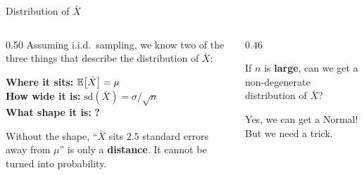\documentclass[9pt,english,aspectratio=169]{beamer}
\begin{document}
\begin{frame}{Distribution of $\bar{X}$}

  \begin{columns}[T]
    \begin{column}{0.50\textwidth}
      \vspace{0.3em}
      Assuming i.i.d.\ sampling, we know two of the three things that describe
      the distribution of $\bar{X}$:

      \vspace{0.5em}
      \begin{methodbox}
        \textbf{Where it sits:} \; $\mathbb{E}\!\left[\bar{X}\right] = \mu$
        \\[0.4em]
        \textbf{How wide it is:} \;
        $\text{sd}\!\left(\bar{X}\right) = \sigma/\sqrt{n}$ \\[0.4em]
        \textbf{What shape it is:} \;
        \textcolor{vermillion}{\textbf{?}}
      \end{methodbox}
      \pause

      \vspace{0.5em}
      Without the shape, ``$\bar{X}$ sits $2.5$ standard errors away from
      $\mu$'' is only a \textbf{distance}. It cannot be turned into probability.
    \end{column}
    \pause
    \begin{column}{0.46\textwidth}
      \vspace{0.3em}
      \begin{questionbox}
        If $n$ is \textbf{large}, can we get a non-degenerate distribution of
        $\bar{X}$?
      \end{questionbox}
      \pause

      \vspace{0.4em}
      \begin{answerbox}
        Yes, we can get a Normal! But we need a trick.
      \end{answerbox}
      
    \end{column}
  \end{columns}

\end{frame}
\end{document}

